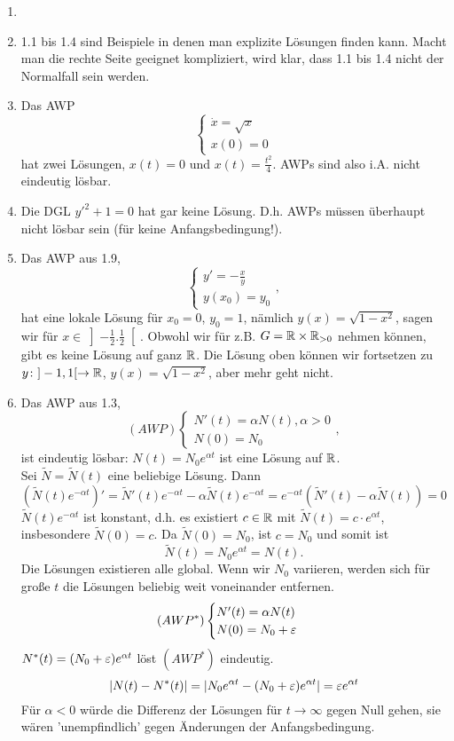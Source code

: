 \begin{beispiel}
	\begin{enumerate}
		\item[]
		\item 1.1 bis 1.4 sind Beispiele in denen man explizite L\"osungen finden kann. Macht man die rechte Seite geeignet kompliziert, wird klar, dass 1.1 bis 1.4 nicht der Normalfall sein werden.
		\item Das AWP
		\[ \begin{cases}
		\dot x=\sqrt x\\ x(0)=0
		\end{cases} \]
		hat zwei L\"osungen, $ x(t)=0 $ und $ x(t)=\frac{t^2}{4} $. AWPs sind also i.A. nicht eindeutig l\"osbar.
		\item Die DGL $ y'^2+1=0 $ hat gar keine L\"osung. D.h. AWPs m\"ussen \"uberhaupt nicht l\"osbar sein (f\"ur keine Anfangsbedingung!).
		\item Das AWP aus 1.9,
		\[ \begin{cases}
		y'=-\frac{x}{y}\\y(x_0)=y_0
		\end{cases}, \]
		hat eine lokale L\"osung f\"ur $ x_0=0 $, $ y_0=1 $, n\"amlich $ y(x)=\sqrt{1-x^2} $, sagen wir f\"ur $ x\in\left]-\frac{1}{2}.\frac{1}{2}\right[ $. Obwohl wir f\"ur z.B. $ G=\mathbb{R}\times\mathbb{R}_{>0} $ nehmen k\"onnen, gibt es keine L\"osung auf ganz $ \mathbb{R} $. Die L\"osung oben k\"onnen wir fortsetzen zu $ y\colon]-1,1[\rightarrow\mathbb{R} $, $ y(x)=\sqrt{1-x^2} $, aber mehr geht nicht.
		\item Das AWP aus 1.3,
		\[ (AWP)\begin{cases}
		N'(t)=\alpha N(t),\alpha>0\\N(0)=N_0
		\end{cases}, \]
		ist eindeutig l\"osbar: $ N(t)=N_0e^{\alpha t} $ ist eine L\"osung auf $ \mathbb{R} $.\\
		Sei $ \tilde N=\tilde N(t) $ eine beliebige L\"osung. Dann 
		\[ (\tilde N(t)e^{-\alpha t})'=\tilde N'(t)e^{-\alpha t}-\alpha\tilde N(t)e^{-\alpha t}=e^{-\alpha t}(\tilde N'(t)-\alpha\tilde N(t))=0 \]
		$ \tilde N(t)e^{-\alpha t} $ ist konstant, d.h. es existiert $ c\in\mathbb{R} $ mit $ \tilde N(t)= c\cdot e^{\alpha t} $, insbesondere $ \tilde N(0)=c $. Da $ \tilde N(0)=N_0 $, ist $ c=N_0 $ und somit ist \[ \tilde N(t)=N_0e^{\alpha t}=N(t). \]
		Die L\"osungen existieren alle global. Wenn wir $ N_0 $ variieren, werden sich f\"ur gro\ss e $ t $ die L\"osungen beliebig weit voneinander entfernen.
		\[ (AWP^\ast)\begin{cases}
		N'(t)=\alpha N(t)\\N(0)=N_0+\varepsilon
		\end{cases} \] 
		$ N^\ast(t)=(N_0+\varepsilon)e^{\alpha t} $ l\"ost $ (AWP^\ast) $ eindeutig.
		\[ |N(t)-N^\ast(t)|=|N_0e^{\alpha t}-(N_0+\varepsilon)e^{\alpha t}|=\varepsilon e^{\alpha t} \]
		F\"ur $ \alpha<0 $ w\"urde die Differenz der L\"osungen f\"ur $ t\to\infty $ gegen Null gehen, sie w\"aren 'unempfindlich' gegen \"Anderungen der Anfangsbedingung.
	\end{enumerate}
\end{beispiel}
